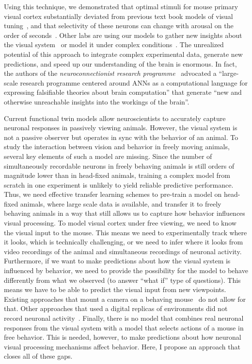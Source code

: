 \documentclass[B2,COG]{ercgrant}
\begin{document}
Using this technique, we demonstrated that optimal stimuli for mouse primary visual cortex substantially deviated from previous text book models of visual tuning~\parencite{Hubel1959-zs}, and that selectivity of these neurons can change with arousal on the order of seconds~\parencite{Franke2022-do}.
Other labs are using our models to gather new insights about the visual system~\parencite{Hofling2022-wr} or model it under complex conditions~\parencite{Parker2022-ac}.
The unrealized potential of this approach to integrate complex experimental data, generate new predictions, and speed up our understanding of the brain is enormous. 
In fact, the authors of the \textit{neuroconnectionist research programme}~\parencite{Doerig2022-ex} advocated a ``large-scale research programme centered around ANNs as a computational language for expressing falsifiable theories about brain computation'' that generate ``new and otherwise unreachable insights into the workings of the brain''. 


Current functional twin models allow neuroscientists  to accurately capture neuronal responses in passively viewing animals. 
However, the visual system is not a passive observer but operates in sync with the behavior of an animal. 
To study the interaction between vision and behavior in freely moving animals, several key elements of such a model are missing. 
Since the number of simultaneously recordable neurons in freely behaving animals is still orders of magnitude lower than in head-fixed animals, training a complex model from scratch in one experiment is unlikely to yield reliable predictive performance. 
Thus, we need effective transfer learning schemes to pre-train a model on head-fixed animals, where large scale data is available, and transfer it to freely behaving animals in a way that still allows us to capture how behavior influences visual processing. 
To model visual cortex under free viewing, we need to know the visual input to the mouse. 
This means we need to experimentally track where it looks, which is technically challenging, or we need to infer where it looks from video recordings of the animal and simultaneous recordings of neuronal activity. 
Furthermore, if we want to make predictions about how the visual system is influenced by behavior, we need to provide the possibility for the model to behave differently from what we observed (to answer ``what if'' type of questions). 
This means we have to be able to predict the visual input from new viewpoints.
Existing approaches that mount a camera on a behaving mouse~\parencite{Parker2022-ac} do not allow for that. 
Other approaches that used a digital replicas of environments did not record neuronal activity~\parencite{Holmgren2021-jv}.
Finally, there is no model that combines real neuronal responses from the visual system with a model that selects actions of a mouse in free behavior. 
This is needed, however, to make predictions about how neuronal visual processing mechanisms affect behavior. 
Here, I propose an approach that closes all of these gaps. 
\end{document}
